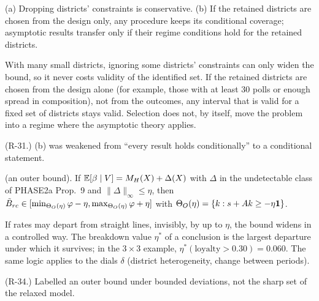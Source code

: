 \begin{result}
 (a) Dropping districts' constraints is conservative. (b) If the
retained districts are chosen from the design only, any procedure keeps its
conditional coverage; asymptotic results transfer only if their regime conditions
hold for the retained districts.
\end{result}
\begin{plain}
With many small districts, ignoring some districts' constraints can only widen
the bound, so it never costs validity of the identified set. If the retained
districts are chosen from the design alone (for example, those with at least 30
polls or enough spread in composition), not from the outcomes, any interval that
is valid for a fixed set of districts stays valid. Selection does not, by itself,
move the problem into a regime where the asymptotic theory applies.
\end{plain}
\begin{revnote}(R-31.) (b) was weakened from ``every result holds conditionally'' to a conditional statement.\end{revnote}

\begin{result}\label{res:s1}
 (an outer bound). If $\mathbb E[\beta\mid V]=M_H(X)+\Delta(X)$ with $\Delta$ in
the undetectable class of PHASE2a Prop.~9 and $\|\Delta\|_\infty\le\eta$, then
$\tilde B_{rc}\in[\min_{\Theta_O(\eta)}\varphi-\eta,\max_{\Theta_O(\eta)}\varphi+\eta]$ with
$\Theta_O(\eta)=\{k:s+Ak\ge-\eta\mathbf 1\}$.
\end{result}
\begin{plain}
If rates may depart from straight lines, invisibly, by up to $\eta$, the bound
widens in a controlled way. The breakdown value $\eta^*$ of a conclusion is the
largest departure under which it survives; in the $3\times3$ example,
$\eta^*(\text{loyalty}>0.30)=0.060$. The same logic applies to the dials $\delta$
(district heterogeneity, change between periods).
\end{plain}
\begin{revnote}(R-34.) Labelled an outer bound under bounded deviations, not the sharp set of the relaxed model.\end{revnote}

